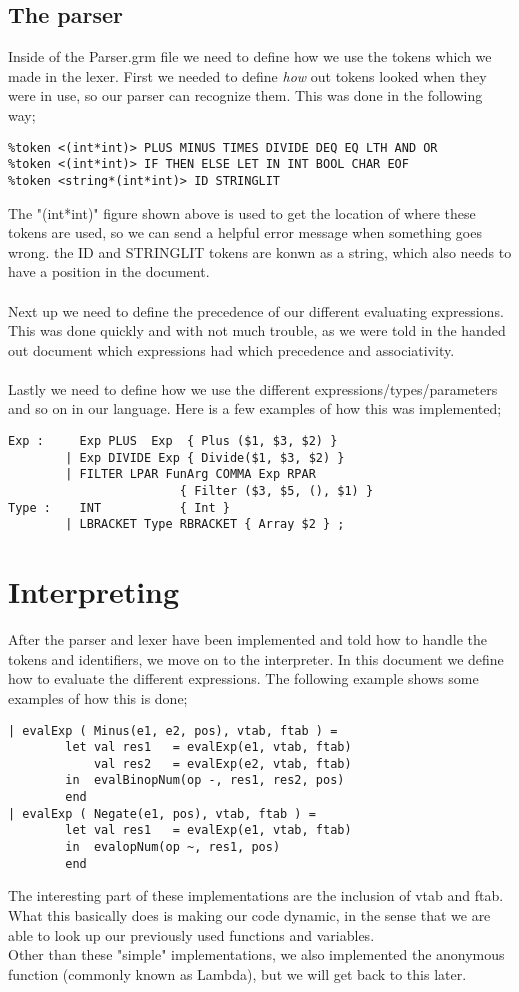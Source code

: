 \documentclass[12pt]{article}
\begin{document}
\subsection{The parser}
Inside of the Parser.grm file we need to define how we use the tokens which we made in the lexer. First we needed to define \textit{how} out tokens looked when they were in use, so our parser can recognize them. This was done in the following way;\\
\begin{verbatim}
%token <(int*int)> PLUS MINUS TIMES DIVIDE DEQ EQ LTH AND OR
%token <(int*int)> IF THEN ELSE LET IN INT BOOL CHAR EOF
%token <string*(int*int)> ID STRINGLIT
\end{verbatim}
The "(int*int)" figure shown above is used to get the location of where these tokens are used, so we can send a helpful error message when something goes wrong. the ID and STRINGLIT tokens are konwn as a string, which also needs to have a position in the document.\\\\
Next up we need to define the precedence of our different evaluating expressions. This was done quickly and with not much trouble, as we were told in the handed out document which expressions had which precedence and associativity.\\\\
Lastly we need to define how we use the different expressions/types/parameters and so on in our language. Here is a few examples of how this was implemented;\\
\begin{verbatim}
Exp :     Exp PLUS  Exp  { Plus ($1, $3, $2) }
        | Exp DIVIDE Exp { Divide($1, $3, $2) }
        | FILTER LPAR FunArg COMMA Exp RPAR
                        { Filter ($3, $5, (), $1) }
Type :    INT           { Int }
        | LBRACKET Type RBRACKET { Array $2 } ;                                  
\end{verbatim}
\section{Interpreting}
After the parser and lexer have been implemented and told how to handle the tokens and identifiers, we move on to the interpreter. In this document we define how to evaluate the different expressions. The following example shows some examples of how this is done;\\
\begin{verbatim}
| evalExp ( Minus(e1, e2, pos), vtab, ftab ) =
        let val res1   = evalExp(e1, vtab, ftab)
            val res2   = evalExp(e2, vtab, ftab)
        in  evalBinopNum(op -, res1, res2, pos)
        end
| evalExp ( Negate(e1, pos), vtab, ftab ) =
        let val res1   = evalExp(e1, vtab, ftab)
        in  evalopNum(op ~, res1, pos)
        end
\end{verbatim}
The interesting part of these implementations are the inclusion of vtab and ftab. What this basically does is making our code dynamic, in the sense that we are able to look up our previously used functions and variables.\\
Other than these "simple" implementations, we also implemented the anonymous function (commonly known as Lambda), but we will get back to this later.
\end{document}
